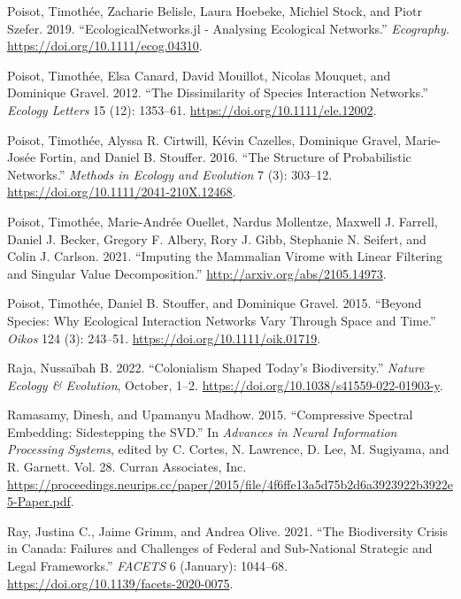 \documentclass[
  letterpaper,
  DIV=11,
  numbers=noendperiod]{scrartcl}
\newlength{\cslhangindent}
\newlength{\cslentryspacingunit} %
\newenvironment{CSLReferences}[2] %
 {%
  \setlength{\parindent}{0pt}
  \ifodd #1
  \let\oldpar\par
  \def\par{\hangindent=\cslhangindent\oldpar}
  \fi
  \setlength{\parskip}{#2\cslentryspacingunit}
 }%
 {}
\begin{document}
\begin{CSLReferences}{1}{0}
\leavevmode{}%
Poisot, Timothée, Zacharie Belisle, Laura Hoebeke, Michiel Stock, and
Piotr Szefer. 2019. {``{EcologicalNetworks}.jl - Analysing Ecological
Networks.''} \emph{Ecography}. \url{https://doi.org/10.1111/ecog.04310}.

\leavevmode{}%
Poisot, Timothée, Elsa Canard, David Mouillot, Nicolas Mouquet, and
Dominique Gravel. 2012. {``The Dissimilarity of Species Interaction
Networks.''} \emph{Ecology Letters} 15 (12): 1353--61.
\url{https://doi.org/10.1111/ele.12002}.

\leavevmode{}%
Poisot, Timothée, Alyssa R. Cirtwill, Kévin Cazelles, Dominique Gravel,
Marie-Josée Fortin, and Daniel B. Stouffer. 2016. {``The Structure of
Probabilistic Networks.''} \emph{Methods in Ecology and Evolution} 7
(3): 303--12. \url{https://doi.org/10.1111/2041-210X.12468}.

\leavevmode{}%
Poisot, Timothée, Marie-Andrée Ouellet, Nardus Mollentze, Maxwell J.
Farrell, Daniel J. Becker, Gregory F. Albery, Rory J. Gibb, Stephanie N.
Seifert, and Colin J. Carlson. 2021. {``Imputing the Mammalian Virome
with Linear Filtering and Singular Value Decomposition.''}
\url{http://arxiv.org/abs/2105.14973}.

\leavevmode{}%
Poisot, Timothée, Daniel B. Stouffer, and Dominique Gravel. 2015.
{``Beyond Species: Why Ecological Interaction Networks Vary Through
Space and Time.''} \emph{Oikos} 124 (3): 243--51.
\url{https://doi.org/10.1111/oik.01719}.

\leavevmode{}%
Raja, Nussaïbah B. 2022. {``Colonialism Shaped Today's Biodiversity.''}
\emph{Nature Ecology \& Evolution}, October, 1--2.
\url{https://doi.org/10.1038/s41559-022-01903-y}.

\leavevmode{}%
Ramasamy, Dinesh, and Upamanyu Madhow. 2015. {``Compressive Spectral
Embedding: Sidestepping the {SVD}.''} In \emph{Advances in Neural
Information Processing Systems}, edited by C. Cortes, N. Lawrence, D.
Lee, M. Sugiyama, and R. Garnett. Vol. 28. {Curran Associates, Inc.}
\url{https://proceedings.neurips.cc/paper/2015/file/4f6ffe13a5d75b2d6a3923922b3922e5-Paper.pdf}.

\leavevmode{}%
Ray, Justina C., Jaime Grimm, and Andrea Olive. 2021. {``The
Biodiversity Crisis in {Canada}: Failures and Challenges of Federal and
Sub-National Strategic and Legal Frameworks.''} \emph{FACETS} 6
(January): 1044--68. \url{https://doi.org/10.1139/facets-2020-0075}.


\end{CSLReferences}
\end{document}
